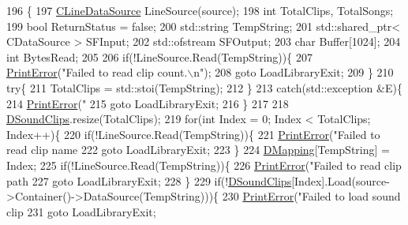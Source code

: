 \begin{DoxyCode}
196                                                                        \{
197     \hyperlink{classCLineDataSource}{CLineDataSource} LineSource(source);
198     \textcolor{keywordtype}{int} TotalClips, TotalSongs;
199     \textcolor{keywordtype}{bool} ReturnStatus = \textcolor{keyword}{false};
200     std::string TempString;
201     std::shared\_ptr< CDataSource >  SFInput;
202     std::ofstream SFOutput;
203     \textcolor{keywordtype}{char} Buffer[1024];
204     \textcolor{keywordtype}{int} BytesRead;
205     
206     \textcolor{keywordflow}{if}(!LineSource.Read(TempString))\{
207         \hyperlink{Debug_8h_a2ed825eefefe35baf59a93a8c641323d}{PrintError}(\textcolor{stringliteral}{"Failed to read clip count.\(\backslash\)n"});
208         \textcolor{keywordflow}{goto} LoadLibraryExit;
209     \}
210     \textcolor{keywordflow}{try}\{
211         TotalClips = std::stoi(TempString);
212     \}
213     \textcolor{keywordflow}{catch}(std::exception &E)\{
214         \hyperlink{Debug_8h_a2ed825eefefe35baf59a93a8c641323d}{PrintError}(\textcolor{stringliteral}{"%
215         \textcolor{keywordflow}{goto} LoadLibraryExit;
216     \}
217         
218     \hyperlink{classCSoundLibraryMixer_af4a006eacdcd590fad6e02cddaf197c2}{DSoundClips}.resize(TotalClips);
219     \textcolor{keywordflow}{for}(\textcolor{keywordtype}{int} Index = 0; Index < TotalClips; Index++)\{
220         \textcolor{keywordflow}{if}(!LineSource.Read(TempString))\{
221             \hyperlink{Debug_8h_a2ed825eefefe35baf59a93a8c641323d}{PrintError}(\textcolor{stringliteral}{"Failed to read clip name %
222             \textcolor{keywordflow}{goto} LoadLibraryExit;
223         \}
224         \hyperlink{classCSoundLibraryMixer_a8f193156cafc61b64f04ed88dcabd27d}{DMapping}[TempString] = Index;
225         \textcolor{keywordflow}{if}(!LineSource.Read(TempString))\{
226             \hyperlink{Debug_8h_a2ed825eefefe35baf59a93a8c641323d}{PrintError}(\textcolor{stringliteral}{"Failed to read clip path %
227             \textcolor{keywordflow}{goto} LoadLibraryExit;
228         \}
229         \textcolor{keywordflow}{if}(!\hyperlink{classCSoundLibraryMixer_af4a006eacdcd590fad6e02cddaf197c2}{DSoundClips}[Index].Load(source->Container()->DataSource(TempString)))\{
230             \hyperlink{Debug_8h_a2ed825eefefe35baf59a93a8c641323d}{PrintError}(\textcolor{stringliteral}{"Failed to load sound clip %
231             \textcolor{keywordflow}{goto} LoadLibraryExit;    
}}}}
\end{DoxyCode}
